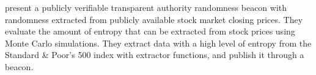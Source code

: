 \citet{clark2010use} present a publicly verifiable transparent authority randomness beacon with randomness extracted from publicly available stock market closing prices.
They evaluate the amount of entropy that can be extracted from stock prices using Monte Carlo simulations.
They extract data with a high level of entropy from the Standard \& Poor's 500 index with extractor functions, and publish it through a beacon.
